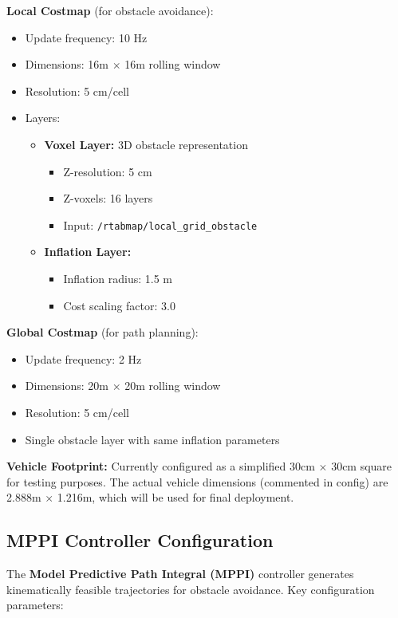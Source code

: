 \textbf{Local Costmap} (for obstacle avoidance):
\begin{itemize}
    \item Update frequency: 10 Hz
    \item Dimensions: 16m $\times$ 16m rolling window
    \item Resolution: 5 cm/cell
    \item Layers:
    \begin{itemize}
        \item \textbf{Voxel Layer:} 3D obstacle representation
        \begin{itemize}
            \item Z-resolution: 5 cm
            \item Z-voxels: 16 layers
            \item Input: \texttt{/rtabmap/local\_grid\_obstacle}
        \end{itemize}
        \item \textbf{Inflation Layer:}
        \begin{itemize}
            \item Inflation radius: 1.5 m
            \item Cost scaling factor: 3.0
        \end{itemize}
    \end{itemize}
\end{itemize}

\textbf{Global Costmap} (for path planning):
\begin{itemize}
    \item Update frequency: 2 Hz
    \item Dimensions: 20m $\times$ 20m rolling window
    \item Resolution: 5 cm/cell
    \item Single obstacle layer with same inflation parameters
\end{itemize}

\textbf{Vehicle Footprint:} Currently configured as a simplified 30cm $\times$ 30cm square for testing purposes. The actual vehicle dimensions (commented in config) are 2.888m $\times$ 1.216m, which will be used for final deployment.

\subsection{MPPI Controller Configuration}

The \textbf{Model Predictive Path Integral (MPPI)} controller generates kinematically feasible trajectories for obstacle avoidance. Key configuration parameters:

